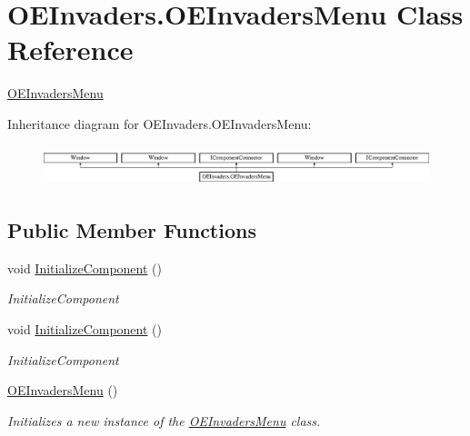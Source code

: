 \hypertarget{class_o_e_invaders_1_1_o_e_invaders_menu}{}\section{O\+E\+Invaders.\+O\+E\+Invaders\+Menu Class Reference}
\label{class_o_e_invaders_1_1_o_e_invaders_menu}


\mbox{\hyperlink{class_o_e_invaders_1_1_o_e_invaders_menu}{O\+E\+Invaders\+Menu}}  


Inheritance diagram for O\+E\+Invaders.\+O\+E\+Invaders\+Menu\+:\begin{figure}[H]
\begin{center}
\leavevmode
\includegraphics[height=1.178947cm]{class_o_e_invaders_1_1_o_e_invaders_menu}
\end{center}
\end{figure}
\subsection*{Public Member Functions}
\begin{DoxyCompactItemize}
\item 
void \mbox{\hyperlink{class_o_e_invaders_1_1_o_e_invaders_menu_ac37b8a5769d575b798377414a4836960}{Initialize\+Component}} ()
\begin{DoxyCompactList}\small\item\em Initialize\+Component \end{DoxyCompactList}\item 
void \mbox{\hyperlink{class_o_e_invaders_1_1_o_e_invaders_menu_ac37b8a5769d575b798377414a4836960}{Initialize\+Component}} ()
\begin{DoxyCompactList}\small\item\em Initialize\+Component \end{DoxyCompactList}\item 
\mbox{\hyperlink{class_o_e_invaders_1_1_o_e_invaders_menu_a8cfb53b3db4ed2d4626af2aa50614278}{O\+E\+Invaders\+Menu}} ()
\begin{DoxyCompactList}\small\item\em Initializes a new instance of the \mbox{\hyperlink{class_o_e_invaders_1_1_o_e_invaders_menu}{O\+E\+Invaders\+Menu}} class. \end{DoxyCompactList}\end{DoxyCompactItemize}


